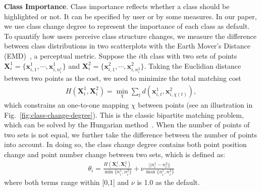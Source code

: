 \vspace{1.5mm}
\noindent\textbf{Class Importance}.
Class importance reflects whether a class should be highlighted or not. It can be specified by user or by some measures. In our paper, we use class change degree to represent the importance of each class as default.
To quantify how users perceive class structure changes, we measure the difference between class distributions in two scatterplots with the Earth Mover's Distance (EMD)~\cite{rubner2000earth}, a perceptual metric.
Suppose the $i$th  class with two sets of points $\mathbf{X}^1_i = \{\mathbf{x}_{i,1}^1, \cdots , \mathbf{x}_{i,n^1_i}^1\}$ and $\mathbf{X}^2_i = \{\mathbf{x}_{i,1}^2, \cdots , \mathbf{x}_{i,n^2_i}^2\}$.
Taking the Euclidian distance between two points as the cost, we need to  minimize the total matching cost
\begin{align}\label{eq:emd}
 H(\mathbf{X}^1_i, \mathbf{X}^2_i)  = \min_\chi \sum_t d(\mathbf{x}_{i,t}^1, \mathbf{x}_{i,\chi(t)}^2),
\end{align}
which constrains an one-to-one mapping $\chi$ between points (see an illustration in Fig.~\ref{fig:class-change-degree}). This is the classic bipartite matching problem, which can be solved by the Hungarian method~\cite{kuhn1955hungarian}.
When the number of points of two sets is not equal, we further take the difference between the number of points into account. In doing so, the class change degree contains both point position change and point number change between two sets, which is defined as:
\begin{align}\label{eq:cm}
 \theta_i= \frac{H(\mathbf{X}^1_i, \mathbf{X}^2_i) }{\min\{n^1_i, n^2_i\}} + \nu \frac{||n^1_i- n^2_i||}{\max\{n^1_i, n^2_i\}}
\end{align}
where both terms range within [0,1] and $\nu$ is 1.0 as the default.


